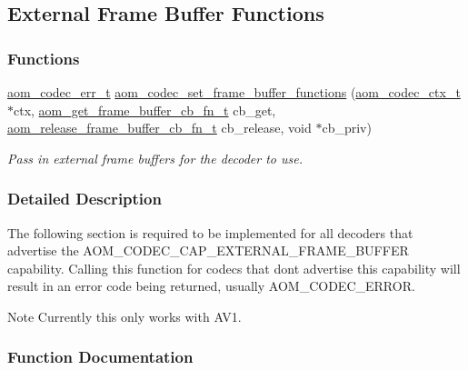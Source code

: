 \hypertarget{group__cap__external__frame__buffer}{}\subsection{External Frame Buffer Functions}
\label{group__cap__external__frame__buffer}
\subsubsection*{Functions}
\begin{DoxyCompactItemize}
\item 
\hyperlink{group__codec_gaaae61e0f8663e6137f1e228757248e7c}{aom\+\_\+codec\+\_\+err\+\_\+t} \hyperlink{group__cap__external__frame__buffer_ga1818a812e4d1e70eeafbe5b0ee538d6e}{aom\+\_\+codec\+\_\+set\+\_\+frame\+\_\+buffer\+\_\+functions} (\hyperlink{group__codec_ga9a1d27f9742d9f70783e3c6cb849b5b4}{aom\+\_\+codec\+\_\+ctx\+\_\+t} $\ast$ctx, \hyperlink{aom__frame__buffer_8h_a01fdfbbc9be8b320437a49d3de07814d}{aom\+\_\+get\+\_\+frame\+\_\+buffer\+\_\+cb\+\_\+fn\+\_\+t} cb\+\_\+get, \hyperlink{aom__frame__buffer_8h_a1803cd0766dc297d88172f174fbb6ab5}{aom\+\_\+release\+\_\+frame\+\_\+buffer\+\_\+cb\+\_\+fn\+\_\+t} cb\+\_\+release, void $\ast$cb\+\_\+priv)
\begin{DoxyCompactList}\small\item\em Pass in external frame buffers for the decoder to use. \end{DoxyCompactList}\end{DoxyCompactItemize}


\subsubsection{Detailed Description}
The following section is required to be implemented for all decoders that advertise the A\+O\+M\+\_\+\+C\+O\+D\+E\+C\+\_\+\+C\+A\+P\+\_\+\+E\+X\+T\+E\+R\+N\+A\+L\+\_\+\+F\+R\+A\+M\+E\+\_\+\+B\+U\+F\+F\+ER capability. Calling this function for codecs that don\textquotesingle{}t advertise this capability will result in an error code being returned, usually A\+O\+M\+\_\+\+C\+O\+D\+E\+C\+\_\+\+E\+R\+R\+OR.

\begin{DoxyNote}{Note}
Currently this only works with A\+V1. 
\end{DoxyNote}


\subsubsection{Function Documentation}
